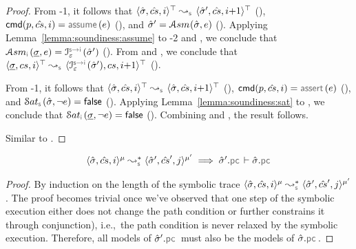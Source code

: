 \begin{proof}
\noindent {}
From \hyp{1}, it follows that $\abssemrule{\sstate, \scs, i}{\sstate', \scs, i{+}1}{\top}{\top}{\symbolic}$ (), 
$\ccmd[\prog][\scs]{i}  = \assume(\jsilexpr)$ (), and $\hat{\sigma}' = \mathcal{A}{sm}_{}(\hat{\sigma}, e)$ (). 
Applying Lemma~\ref{lemma:soundiness:assume} to 
\hyp{2} and , we conclude that 
$\absassume{\instrumented}(\istate, \jsilexpr) = \interpret{\symbinst}{\senv}(\sstate')$ (). 
From  and , we conclude that 
 $\abssemrule{\istate, \cs, i}{\interpret{\symbinst}{\senv}(\sstate'), \cs, i{+}1}{\top}{\top}{\symbolic}$ (). 
 \vspace{5pt}

\noindent {}
From \hyp{1}, it follows that $\abssemrule{\sstate, \scs, i}{\sstate, \scs, i{+}1}{\top}{\top}{\symbolic}$ (), 
$ \ccmd[\prog][\scs]{i}  = \assert(\jsilexpr)$ (), and $\abssat{\symbolic}(\sstate, \neg \jsilexpr) = \jfalse$ (). 
Applying Lemma~\ref{lemma:soundiness:sat} to , we conclude that 
$\abssat{\instrumented}(\istate, \neg \jsilexpr) = \jfalse$ (). 
Combining  and , the result follows. 
 \vspace{5pt}
 
\noindent {}
Similar to . 
 \vspace{5pt} 
\end{proof}


\begin{lemma}\label{lemma:pc:monotonocity}
$$
\begin{array}{l}
\transabssemrule{\sstate, \scs, i}{\sstate', \scs', j}{\mode}{\mode'}{\symbolic} 
    \implies \sstate'.\pcsel \vdash \sstate.\pcsel
\end{array}
$$
\end{lemma}
\begin{proof}
By induction on the length of the symbolic trace $\transabssemrule{\sstate, \scs, i}{\sstate', \scs', j}{\mode}{\mode'}{\symbolic}$.
The proof becomes trivial once we've observed that one step of the symbolic execution either does not change the path condition or further constrains it through conjunction), i.e.,~the path condition is never relaxed by the symbolic execution. Therefore, all models of $\sstate'.\pcsel$ must also be the models of $\sstate.\pcsel$.
\end{proof}


